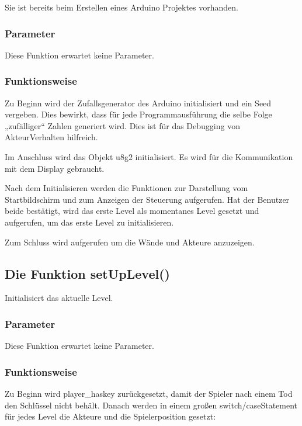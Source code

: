 \documentclass[letterpaper,10pt,ngerman]{sphinxmanual}
\begin{document}
Sie ist bereits beim Erstellen eines Arduino Projektes vorhanden.


\subsubsection{Parameter}
\label{\detokenize{programming:id15}}
Diese Funktion erwartet keine Parameter.


\subsubsection{Funktionsweise}
\label{\detokenize{programming:id16}}
Zu Beginn wird der Zufallsgenerator des Arduino initialisiert und ein Seed
vergeben. Dies bewirkt, dass für jede Programmausführung die selbe Folge
„zufälliger“ Zahlen generiert wird. Dies ist für das Debugging von
Akteur\sphinxhyphen{}Verhalten hilfreich.

Im Anschluss wird das Objekt u8g2 initialisiert. Es wird für die Kommunikation
mit dem Display gebraucht.

Nach dem Initialisieren werden die Funktionen zur Darstellung vom
Startbildschirm und zum Anzeigen der Steuerung aufgerufen. Hat der Benutzer
beide bestätigt, wird das erste Level als momentanes Level gesetzt und
 aufgerufen, um das erste Level zu initialisieren.

Zum Schluss wird  aufgerufen um die Wände und Akteure anzuzeigen.


\subsection{Die Funktion setUpLevel()}
\label{\detokenize{programming:die-funktion-setuplevel}}
Initialisiert das aktuelle Level.


\subsubsection{Parameter}
\label{\detokenize{programming:id17}}
Diese Funktion erwartet keine Parameter.


\subsubsection{Funktionsweise}
\label{\detokenize{programming:id18}}
Zu Beginn wird player\_haskey zurückgesetzt, damit der Spieler nach einem Tod
den Schlüssel nicht behält. Danach werden in einem großen switch/case\sphinxhyphen{}Statement
für jedes Level die Akteure und die Spielerposition gesetzt:
\end{document}

